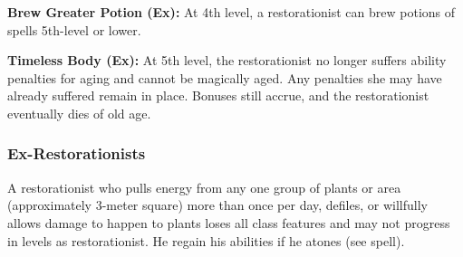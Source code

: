 {\textbf{Brew Greater Potion (Ex):} At 4th level, a restorationist can brew potions of spells 5th-level or lower.

\textbf{Timeless Body (Ex):} At 5th level, the restorationist no longer suffers ability penalties for aging and cannot be magically aged. Any penalties she may have already suffered remain in place. Bonuses still accrue, and the restorationist eventually dies of old age.

\subsubsection{Ex-Restorationists}
A restorationist who pulls energy from any one group of plants or area (approximately 3-meter square) more than once per day, defiles, or willfully allows damage to happen to plants loses all class features and may not progress in levels as restorationist. He regain his abilities if he atones (see  spell).
}